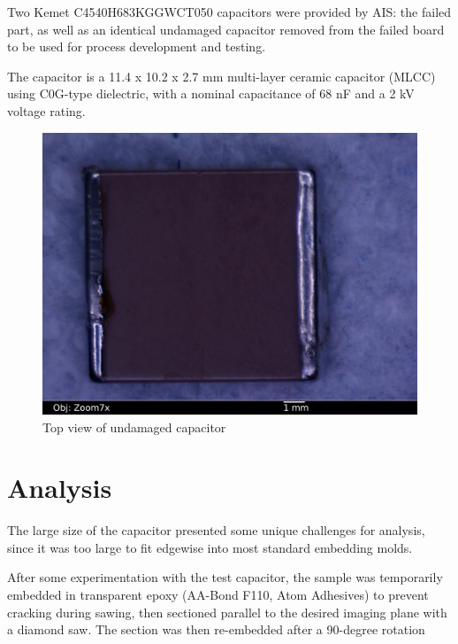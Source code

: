 \documentclass{article}
\begin{document}
Two Kemet C4540H683KGGWCT050 capacitors were provided by AIS: the failed part, as well as an identical undamaged
capacitor removed from the failed board to be used for process development and testing.

The capacitor is a 11.4 x 10.2 x 2.7 mm multi-layer ceramic capacitor (MLCC) using C0G-type dielectric, with a nominal
capacitance of 68 nF and a 2 kV voltage rating.

\begin{figure}[h]
\includegraphics[scale=0.25]{01-goodcap-top_annotated.jpg}
\caption{Top view of undamaged capacitor}
\label{overview}
\end{figure}

\pagebreak
\section{Analysis}

The large size of the capacitor presented some unique challenges for analysis, since it was too large to fit edgewise
into most standard embedding molds.

After some experimentation with the test capacitor, the sample was temporarily embedded in transparent epoxy (AA-Bond
F110, Atom Adhesives) to prevent cracking during sawing, then sectioned parallel to the desired imaging plane with
a diamond saw. The section was then re-embedded after a 90-degree rotation
\end{document}
